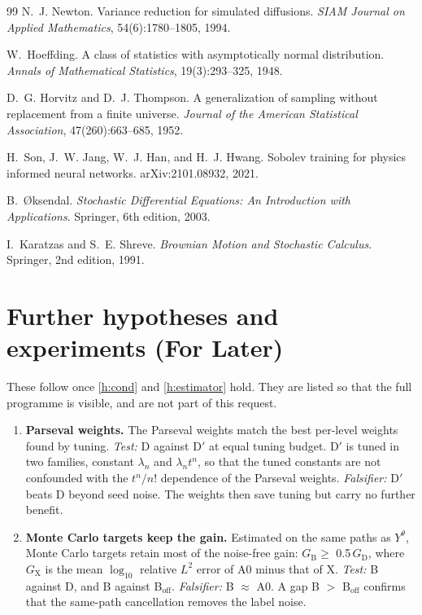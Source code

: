 \documentclass[english]{article}
\begin{document}
\begin{thebibliography}{99}
N.~J. Newton.
\newblock Variance reduction for simulated diffusions.
\newblock \emph{SIAM Journal on Applied Mathematics}, 54(6):1780--1805, 1994.

W.~Hoeffding.
\newblock A class of statistics with asymptotically normal distribution.
\newblock \emph{Annals of Mathematical Statistics}, 19(3):293--325, 1948.

D.~G. Horvitz and D.~J. Thompson.
\newblock A generalization of sampling without replacement from a finite universe.
\newblock \emph{Journal of the American Statistical Association}, 47(260):663--685, 1952.

H.~Son, J.~W. Jang, W.~J. Han, and H.~J. Hwang.
\newblock Sobolev training for physics informed neural networks.
\newblock arXiv:2101.08932, 2021.

B.~{\O}ksendal.
\newblock \emph{Stochastic Differential Equations: An Introduction with Applications}.
\newblock Springer, 6th edition, 2003.

I.~Karatzas and S.~E. Shreve.
\newblock \emph{Brownian Motion and Stochastic Calculus}.
\newblock Springer, 2nd edition, 1991.

\end{thebibliography}
\newpage
\appendix
\section{Further hypotheses and experiments (For Later)}\label{sec:further}
These follow once \ref{h:cond} and \ref{h:estimator} hold. They are listed so that the full programme is visible, and are not part of this request.

\begin{enumerate}[label=\textbf{H\arabic*}, ref=H\arabic*, leftmargin=*, start=3]
  \item\label{h:weights} \textbf{Parseval weights.} The Parseval weights match the best per-level weights found by tuning. \emph{Test:} D against D$'$ at equal tuning budget. D$'$ is tuned in two families, constant $\lambda_n$ and $\lambda_n t^n$, so that the tuned constants are not confounded with the $t^n/n!$ dependence of the Parseval weights. \emph{Falsifier:} D$'$ beats D beyond seed noise. The weights then save tuning but carry no further benefit.
  \item\label{h:noise} \textbf{Monte Carlo targets keep the gain.} Estimated on the same paths as $Y^\theta$, Monte Carlo targets retain most of the noise-free gain: $G_\mathrm B \ge$ 0.5\,$G_\mathrm D$, where $G_\mathrm X$ is the mean $\log_{10}$ relative $L^2$ error of A0 minus that of X. \emph{Test:} B against D, and B against B$_{\mathrm{off}}$. \emph{Falsifier:} B $\approx$ A0. A gap B $>$ B$_{\mathrm{off}}$ confirms that the same-path cancellation removes the label noise.
\end{enumerate}
\end{document}
